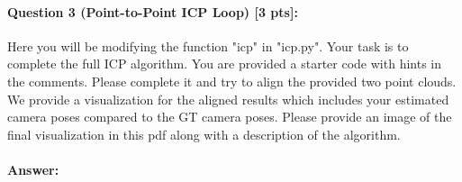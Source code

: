 \documentclass[11pt]{article}
\begin{document}
\paragraph{Question 3 (Point-to-Point ICP Loop) [3 pts]:} Here you will be modifying the function "icp" in "icp.py". Your task is to complete the full ICP algorithm. You are provided a starter code with hints in the comments. Please complete it and try to align the provided two point clouds. We provide a visualization for the aligned results which includes your estimated camera poses compared to the GT camera poses. Please provide an image of the final visualization in this pdf along with a description of the algorithm.
\paragraph{Answer:} 
\end{document}
